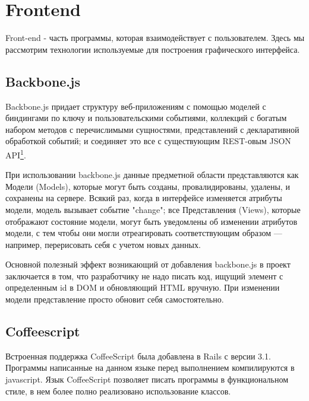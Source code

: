 \section{Frontend}
Front-end - часть программы, которая взаимодействует с пользователем. Здесь мы
рассмотрим технологии используемые для построения графического интерфейса.

\subsection{Backbone.js}
Backbone.js придает структуру веб-приложениям с помощью моделей с биндингами по
ключу и пользовательскими событиями, коллекций с богатым набором методов с
перечислимыми сущностями, представлений с декларативной обработкой событий; и
соединяет это все с существующим REST-овым JSON API\footnote{
	\url{http://backbonejs.ru/}
}.

При использовании backbone.js данные предметной области представляются как
Модели (Models), которые могут быть созданы, провалидированы, удалены, и
сохранены на сервере. Всякий раз, когда в интерфейсе изменяется атрибуты модели,
модель вызывает событие "change"; все Представления (Views), которые отображают
состояние модели, могут быть уведомлены об изменении атрибутов модели, с тем
чтобы они могли отреагировать соответствующим образом — например, перерисовать
себя с учетом новых данных.

Основной полезный эффект возникающий от добавления backbone.js в проект
заключается в том, что разработчику не надо писать код, ищущий элемент с
определенным id в DOM и обновляющий HTML вручную. При изменении модели
представление просто обновит себя самостоятельно.

\subsection{Coffeescript}
Встроенная поддержка CoffeeScript была добавлена в Rails с версии 3.1. Программы
написанные на данном языке перед выполнением компилируются в javascript. Язык
CoffeeScript позволяет писать программы в функциональном стиле, в нем более
полно реализовано использование классов.

CoffeeScript используется чтобы улучшить читаемость кода и уменьшить его размер.
В среднем для выполнения одинаковых действий на CoffeeScript требуется в 2 раза
меньше строк, чем JavaScript\footnote{
	\url{http://coffeescript.org/}
}.

\subsection{RequireJs}
При разработке приложений с модульной структурой на JavaScript возникает две
проблемы:
\begin{enumerate}
  \item описание и удовлетворение зависимостей различных частей приложения, необходимость организации подключения зависимостей на серверной стороне;
  \item экспорт переменных в глобальную область видимости и их коллизия. 
\end{enumerate}

